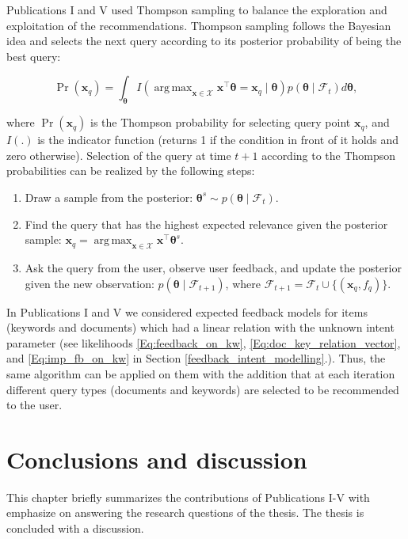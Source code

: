 \documentclass[dissertation,math,vertlayout,pdfa,colorlinks]{aaltoseries}
\newcommand{\bF}{\mathcal{F}}
\newcommand{\tp}{^{\top}}
\DeclareMathOperator*{\argmax}{arg\,max}
\begin{document}
Publications I and V used Thompson sampling to balance the exploration and exploitation of the recommendations. Thompson sampling follows the Bayesian idea and selects the next query according to its posterior probability of being the best query:  

\begin{equation}\label{Eq:Thompson}
\Pr(\bm{x}_{q})=\!\!\int_{\bm{\theta}}\!\!I(\argmax_{\bm{x} \in \mathcal{X}} \bm{x}\tp \bm{\theta} \!=\!\bm{x}_{q}\!\!\mid \!\bm{\theta}) p(\bm{\theta} \mid \bF_t) d\bm{\theta},
\end{equation}
 

\noindent where $\Pr(\bm{x}_{q})$ is the Thompson probability for selecting query point $\bm{x}_{q}$, and $I(.)$ is the indicator function (returns 1 if the condition in front of it holds and zero otherwise). Selection of the query at time $t+1$ according to the Thompson probabilities can be realized by the following steps:

\begin{enumerate}
	\item Draw a sample from the posterior: $ \bm{\theta}^s \sim p(\bm{\theta} \mid \bF_t)$.
	\item Find the query that has the highest expected relevance given the posterior sample: $\bm{x}_{q} = \argmax_{\bm{x} \in \mathcal{X}} \bm{x}\tp \bm{\theta}^s$.
	\item Ask the query from the user, observe user feedback, and update the posterior given the new observation: $p(\bm{\theta} \mid \bF_{t+1})$, where $ \bF_{t+1} = \bF_{t} \cup \{(\bm{x}_{q},f_q)\}$.
\end{enumerate}

In Publications I and V we considered expected feedback models for items (keywords and documents) which had a linear relation with the unknown intent parameter (see likelihoods  \ref{Eq:feedback_on_kw}, \ref{Eq:doc_key_relation_vector}, and \ref{Eq:imp_fb_on_kw} in Section \ref{feedback_intent_modelling}.). Thus, the same algorithm can be applied on them with the addition that at each iteration different query types (documents and keywords) are selected to be recommended to the user.


\chapter{Conclusions and discussion}
This chapter briefly summarizes the contributions of Publications I-V with emphasize on answering the research questions of the thesis. The thesis is concluded with a discussion.
\end{document}
